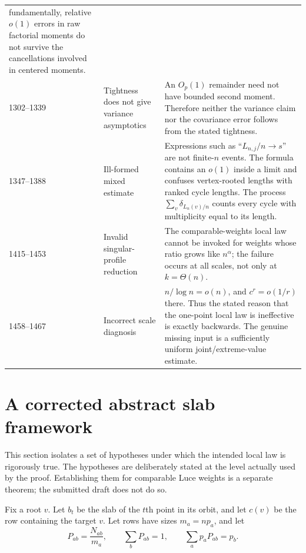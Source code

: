 \documentclass[11pt]{article}
\newcommand{\1}{\mathbf 1}
\theoremstyle{remark}
\begin{document}
\begin{longtable}{p{}p{}p{}}
fundamentally, relative $o(1)$ errors in raw factorial moments do not survive
the cancellations involved in centered moments. \\
1302--1339 & Tightness does not give variance asymptotics & An $O_p(1)$ remainder
need not have bounded second moment.  Therefore neither the variance claim nor
the covariance error follows from the stated tightness. \\
1347--1388 & Ill-formed mixed estimate & Expressions such as
``$L_{n,j}/n\to s$'' are not finite-$n$ events.  The formula contains an
$o(1)$ inside a limit and confuses vertex-rooted lengths with ranked cycle
lengths.  The process $\sum_v\delta_{L_n(v)/n}$ counts every cycle with
multiplicity equal to its length. \\
1415--1453 & Invalid singular-profile reduction & The comparable-weights local
law cannot be invoked for weights whose ratio grows like $n^\alpha$; the
failure occurs at all scales, not only at $k=\Theta(n)$. \\
1458--1467 & Incorrect scale diagnosis & $n/\log n=o(n)$, and
$c^r=o(1/r)$ there.  Thus the stated reason that the one-point local law is
ineffective is exactly backwards.  The genuine missing input is a sufficiently
uniform joint/extreme-value estimate. \\
\bottomrule
\end{longtable}

\section{A corrected abstract slab framework}

This section isolates a set of hypotheses under which the intended local law
is rigorously true.  The hypotheses are deliberately stated at the level
actually used by the proof.  Establishing them for comparable Luce weights is
a separate theorem; the submitted draft does not do so.

Fix a root $v$.  Let $b_t$ be the slab of the $t$th point in its orbit, and let
$c(v)$ be the row containing the target $v$.  Let rows have sizes
$m_a=np_a$, and let
\[
 P_{ab}=\frac{N_{ab}}{m_a},\qquad \sum_bP_{ab}=1,
 \qquad \sum_a p_aP_{ab}=p_b.
\]
\end{document}
